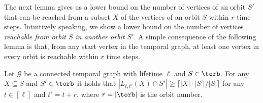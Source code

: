 The next lemma gives us a lower bound on the number of vertices of an orbit $S'$
that can be reached from a subset $X$ of the vertices of an orbit $S$
{within $r$ time steps}. Intuitively speaking, we show a lower bound on the
number of vertices {\em reachable from orbit $S$ {in} another orbit $S'$}.
{A simple consequence of the following lemma is that, from any start vertex
in the temporal graph, at least one vertex in every orbit is reachable within
$r$ time steps.}

\begin{lemma}\label{lem:laneorbit} Let
    $\mathcal{G}$ be a connected temporal graph with lifetime $\ell$ and $S \in
    \torb$. For any $X \subseteq S$ and $S' \in \torb$ it holds that $|L_{t,
    t'}(X) \cap S'| \geq  \lceil |X| \cdot |S'|/|S| \rceil$ for any $t \in
    [\ell]$ and $t'=t+r$, where $r=|\torb|$ is the orbit number.
\end{lemma}
